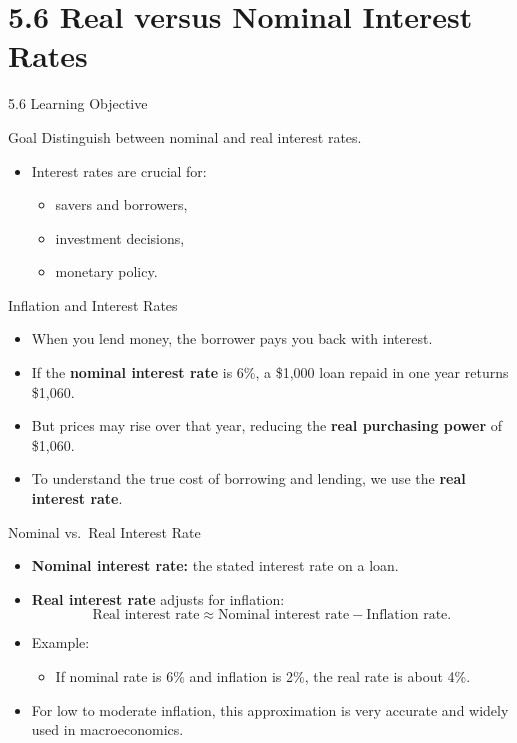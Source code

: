 \documentclass[aspectratio=169]{beamer}
\begin{document}
\section{5.6 Real versus Nominal Interest Rates}

\begin{frame}{5.6 Learning Objective}
\transfade
\begin{block}{Goal}
Distinguish between nominal and real interest rates.
\end{block}
\begin{itemize}
  \item Interest rates are crucial for:
  \begin{itemize}
    \item savers and borrowers,
    \item investment decisions,
    \item monetary policy.
  \end{itemize}
\end{itemize}
\end{frame}

\begin{frame}{Inflation and Interest Rates}
\transfade
\begin{itemize}
  \item When you lend money, the borrower pays you back with interest.
  \item If the \textbf{nominal interest rate} is 6\%, a \$1,000 loan repaid in one year returns \$1,060.
  \item But prices may rise over that year, reducing the \textbf{real purchasing power} of \$1,060.
  \item To understand the true cost of borrowing and lending, we use the \textbf{real interest rate}.
\end{itemize}
\end{frame}

\begin{frame}{Nominal vs.\ Real Interest Rate}
\transfade
\begin{itemize}
  \item \textbf{Nominal interest rate:} the stated interest rate on a loan.
  \item \textbf{Real interest rate} adjusts for inflation:
  \[
    \text{Real interest rate} \approx
    \text{Nominal interest rate} - \text{Inflation rate}.
  \]
  \item Example:
  \begin{itemize}
    \item If nominal rate is 6\% and inflation is 2\%, the real rate is about 4\%.
  \end{itemize}
  \item For low to moderate inflation, this approximation is very accurate and widely used in macroeconomics.
\end{itemize}
\end{frame}
\end{document}
